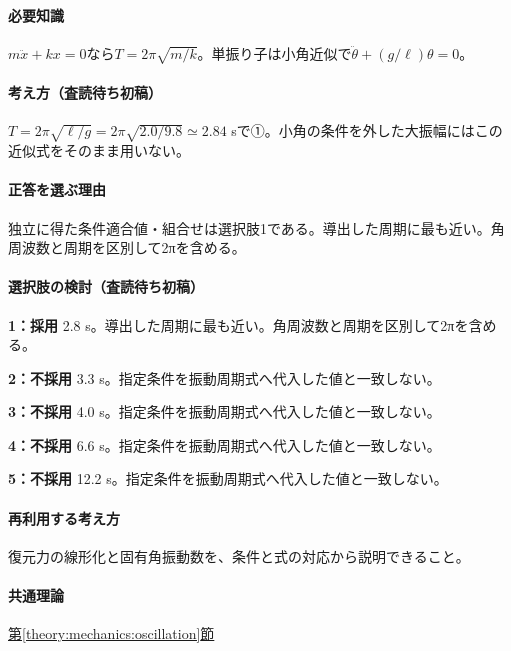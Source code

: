 \paragraph{必要知識} \(m\ddot x+kx=0\)なら\(T=2\pi\sqrt{m/k}\)。単振り子は小角近似で\(\ddot\theta+(g/\ell)\theta=0\)。

\paragraph{考え方（査読待ち初稿）} \(T=2\pi\sqrt{\ell/g}=2\pi\sqrt{2.0/9.8}\simeq2.84\) sで①。小角の条件を外した大振幅にはこの近似式をそのまま用いない。

\paragraph{正答を選ぶ理由} 独立に得た条件適合値・組合せは選択肢1である。導出した周期に最も近い。角周波数と周期を区別して2πを含める。

\paragraph{選択肢の検討（査読待ち初稿）}\mbox{}\par

\noindent\textbf{1：採用} 2.8 s。導出した周期に最も近い。角周波数と周期を区別して2πを含める。\par

\noindent\textbf{2：不採用} 3.3 s。指定条件を振動周期式へ代入した値と一致しない。\par

\noindent\textbf{3：不採用} 4.0 s。指定条件を振動周期式へ代入した値と一致しない。\par

\noindent\textbf{4：不採用} 6.6 s。指定条件を振動周期式へ代入した値と一致しない。\par

\noindent\textbf{5：不採用} 12.2 s。指定条件を振動周期式へ代入した値と一致しない。\par

\paragraph{再利用する考え方} 復元力の線形化と固有角振動数を、条件と式の対応から説明できること。

\paragraph{共通理論} \hyperref[theory:mechanics:oscillation]{第\ref*{theory:mechanics:oscillation}節}

